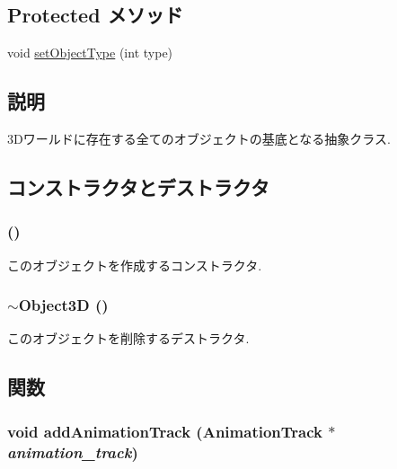 \subsection*{Protected メソッド}
\begin{CompactItemize}
\item 
void \hyperlink{classm3g_1_1Object3D_777701a101d1332abffa2ad6a255b91d}{setObjectType} (int type)
\end{CompactItemize}


\subsection{説明}
3Dワールドに存在する全てのオブジェクトの基底となる抽象クラス. 

\subsection{コンストラクタとデストラクタ}
\hypertarget{classm3g_1_1Object3D_f4b10c33b9014a3f0a675ef4b699b773}{
\subsubsection[{Object3D}]{ ()}}
\label{classm3g_1_1Object3D_f4b10c33b9014a3f0a675ef4b699b773}


このオブジェクトを作成するコンストラクタ. \hypertarget{classm3g_1_1Object3D_8ece10725587e63a2c75283c16cc4df5}{
\subsubsection[{$\sim$Object3D}]{\setlength{\rightskip}{0pt plus 5cm}$\sim${\bf Object3D} ()}}
\label{classm3g_1_1Object3D_8ece10725587e63a2c75283c16cc4df5}


このオブジェクトを削除するデストラクタ. 

\subsection{関数}
\hypertarget{classm3g_1_1Object3D_415c0b110f95410ded9b85e5d99a496b}{
\subsubsection[{addAnimationTrack}]{\setlength{\rightskip}{0pt plus 5cm}void addAnimationTrack ({\bf AnimationTrack} $\ast$ {\em animation\_\-track})}}
\label{classm3g_1_1Object3D_415c0b110f95410ded9b85e5d99a496b}


